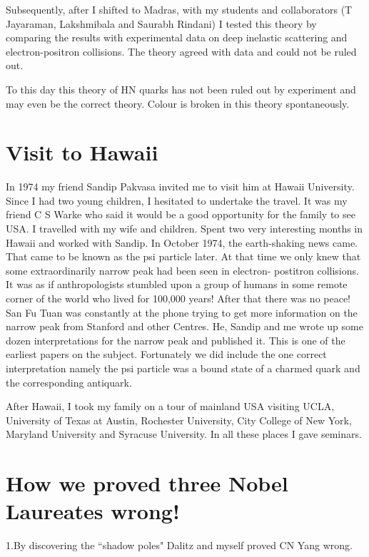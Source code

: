 Subsequently, after I shifted to Madras, with my students and 
collaborators (T Jayaraman, Lakshmibala and Saurabh Rindani) I tested 
this theory by comparing the results with experimental data on deep 
inelastic scattering and electron-positron collisions. The theory agreed 
with data and could not be ruled out.

To this day this theory of HN quarks has not been ruled out by 
experiment and may even be the correct theory. Colour is broken in this 
theory spontaneously.

\section*{Visit to Hawaii}

In 1974 my friend Sandip Pakvasa invited me to visit him at Hawaii 
University. Since I had two young children, I hesitated to undertake the 
travel. It was my friend C S Warke who said it would be a good 
opportunity for the family to see USA. I travelled with my wife and 
children. Spent two very interesting months in Hawaii and worked with 
Sandip. In October 1974, the earth-shaking news came. That came to be 
known as the psi particle later. At that time we only knew that some 
extraordinarily narrow peak had been seen in electron- postitron 
collisions. It was as if anthropologists stumbled upon a group of humans 
in some remote corner of the world who lived for 100,000 years! After 
that there was no peace! San Fu Tuan was constantly at the phone trying 
to get more information on the narrow peak from Stanford and other 
Centres. He, Sandip and me wrote up some dozen interpretations for the 
narrow peak and published it. This is one of the earliest papers on the 
subject. Fortunately we did include the one correct interpretation 
namely the psi particle was a bound state of a charmed quark and the 
corresponding antiquark.

After Hawaii, I took my family on a tour of mainland USA visiting UCLA, 
University of Texas at Austin, Rochester University, City College of New 
York, Maryland University and Syracuse University. In all these places I 
gave seminars.

\section*{How we proved three Nobel Laureates wrong!}

1.By discovering the ``shadow poles" Dalitz and myself proved CN Yang 
wrong.

